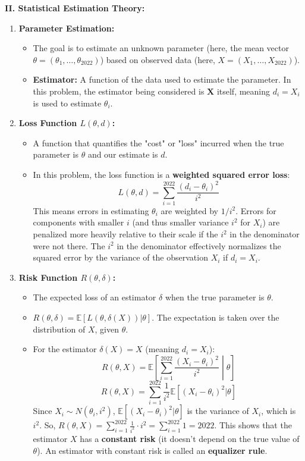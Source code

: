\textbf{II. Statistical Estimation Theory:}

\begin{enumerate}
	\item \textbf{Parameter Estimation:}
	\begin{itemize}
		\item The goal is to estimate an unknown parameter (here, the mean vector $\theta = (\theta_1, \ldots, \theta_{2022})$) based on observed data (here, $X = (X_1, \ldots, X_{2022})$).
		\item \textbf{Estimator:} A function of the data used to estimate the parameter. In this problem, the estimator being considered is $\mathbf{X}$ itself, meaning $d_i = X_i$ is used to estimate $\theta_i$.
	\end{itemize}
	\item \textbf{Loss Function $L(\theta, d)$:}
	\begin{itemize}
		\item A function that quantifies the "cost" or "loss" incurred when the true parameter is $\theta$ and our estimate is $d$.
		\item In this problem, the loss function is a \textbf{weighted squared error loss}:
\[
L(\theta, d) = \sum_{i=1}^{2022} \frac{(d_i - \theta_i)^2}{i^2}
\]This means errors in estimating $\theta_i$ are weighted by $1/i^2$. Errors for components with smaller $i$ (and thus smaller variance $i^2$ for $X_i$) are penalized more heavily relative to their scale if the $i^2$ in the denominator were not there. The $i^2$ in the denominator effectively normalizes the squared error by the variance of the observation $X_i$ if $d_i=X_i$.
	\end{itemize}
	\item \textbf{Risk Function $R(\theta, \delta)$:}
	\begin{itemize}
		\item The expected loss of an estimator $\delta$ when the true parameter is $\theta$.
		\item $R(\theta, \delta) = \mathbb{E}[L(\theta, \delta(X)) | \theta]$. The expectation is taken over the distribution of $X$, given $\theta$.
		\item For the estimator $\delta(X) = X$ (meaning $d_i = X_i$):
\[
R(\theta, X) = \mathbb{E}\left[\sum_{i=1}^{2022} \frac{(X_i - \theta_i)^2}{i^2} \middle| \theta\right]
\]\[
R(\theta, X) = \sum_{i=1}^{2022} \frac{1}{i^2} \mathbb{E}[(X_i - \theta_i)^2 | \theta]
\]Since $X_i \sim N(\theta_i, i^2)$, $\mathbb{E}[(X_i - \theta_i)^2 | \theta]$ is the variance of $X_i$, which is $i^2$.
So, $R(\theta, X) = \sum_{i=1}^{2022} \frac{1}{i^2} \cdot i^2 = \sum_{i=1}^{2022} 1 = 2022$.
This shows that the estimator $X$ has a \textbf{constant risk} (it doesn't depend on the true value of $\theta$). An estimator with constant risk is called an \textbf{equalizer rule}.
	\end{itemize}
\end{enumerate}

